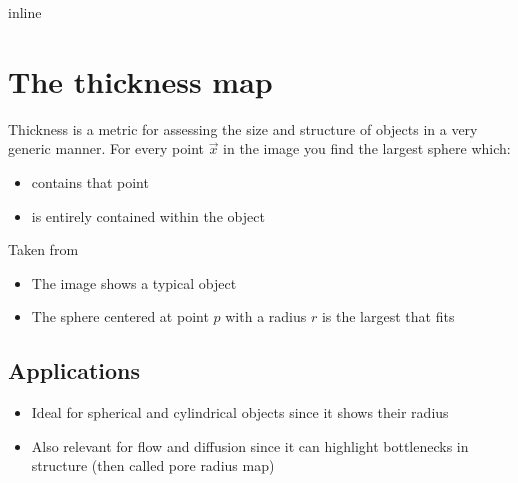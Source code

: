 \documentclass[letterpaper,10pt,english]{sphinxmanual}
\begin{document}
\noindent{}

\begin{sphinxVerbatim}[commandchars=\\\{\}]
     
   
   
   
   
 inline
\end{sphinxVerbatim}


\chapter{The thickness map}
\label{\detokenize{06-AdvancedShapeAndTexture:the-thickness-map}}
\sphinxAtStartPar
Thickness is a metric for assessing the size and structure of objects in a very generic manner.
For every point \(\vec{x}\) in the image you find the largest sphere which:
\begin{itemize}
\item {} 
\sphinxAtStartPar
contains that point

\item {} 
\sphinxAtStartPar
is entirely contained within the object

\end{itemize}



\sphinxAtStartPar
Taken from 
\begin{itemize}
\item {} 
\sphinxAtStartPar
The image shows a typical object

\item {} 
\sphinxAtStartPar
The sphere centered at point \(p\) with a radius \(r\) is the largest that fits

\end{itemize}


\section{Applications}
\label{\detokenize{06-AdvancedShapeAndTexture:applications}}\begin{itemize}
\item {} 
\sphinxAtStartPar
Ideal for spherical and cylindrical objects since it shows their radius

\item {} 
\sphinxAtStartPar
Also relevant for flow and diffusion since it can highlight bottlenecks in structure (then called pore radius map) 

\end{itemize}
\end{document}
